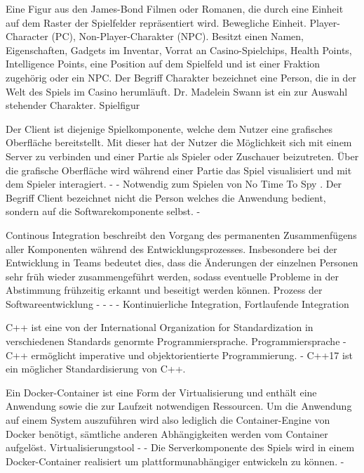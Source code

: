 {Eine Figur aus den James-Bond Filmen oder Romanen, die durch eine Einheit auf dem Raster der Spielfelder repräsentiert wird.}
{Bewegliche Einheit.}
{Player-Character (PC), Non-Player-Charakter (NPC).}
{Besitzt einen Namen, Eigenschaften, Gadgets im Inventar, Vorrat an Casino-Spielchips, Health Points, Intelligence Points, eine Position auf dem Spielfeld und ist einer Fraktion zugehörig oder ein NPC.}
{Der Begriff \glqq{}Charakter\grqq{} bezeichnet eine Person, die in der Welt des Spiels im Casino herumläuft.}
{Dr. Madelein Swann ist ein zur Auswahl stehender Charakter.}
{Spielfigur}

{Der Client ist diejenige Spielkomponente, welche dem Nutzer eine grafisches Oberfläche bereitstellt. Mit dieser hat der Nutzer die Möglichkeit sich mit einem Server zu verbinden und einer Partie als Spieler oder Zuschauer beizutreten. Über die grafische Oberfläche wird während einer Partie das Spiel visualisiert und mit dem Spieler interagiert. }
{-}
{-}
{Notwendig zum Spielen von \glqq{}No Time To Spy\grqq{} .}
{Der Begriff Client bezeichnet nicht die Person welches die Anwendung bedient, sondern auf die Softwarekomponente selbst.}
{-}

{Continous Integration beschreibt den Vorgang des permanenten Zusammenfügens aller Komponenten während des Entwicklungsprozesses. Insbesondere bei der Entwicklung in Teams bedeutet dies, dass die Änderungen der einzelnen Personen sehr früh wieder zusammengeführt werden, sodass eventuelle Probleme in der Abstimmung frühzeitig erkannt und beseitigt werden können.}
{Prozess der Softwareentwicklung}
{-}
{-}
{-}
{-}
{Kontinuierliche Integration, Fortlaufende Integration}

{C++ ist eine von der \glqq{}International Organization for Standardization\grqq{} in verschiedenen Standards genormte Programmiersprache.}
{Programmiersprache}
{-}
{C++ ermöglicht imperative und objektorientierte Programmierung.}
{-}
{C++17 ist ein möglicher Standardisierung von C++.}

{Ein Docker-Container ist eine Form der Virtualisierung und enthält eine Anwendung sowie die zur Laufzeit notwendigen Ressourcen. Um die Anwendung auf einem System auszuführen wird also lediglich die Container-Engine von Docker benötigt, sämtliche anderen Abhängigkeiten werden vom Container aufgelöst.}
{Virtualisierungstool}
{-}
{-}
{Die Serverkomponente des Spiels wird in einem Docker-Container realisiert um plattformunabhängiger entwickeln zu können.}
{-}

